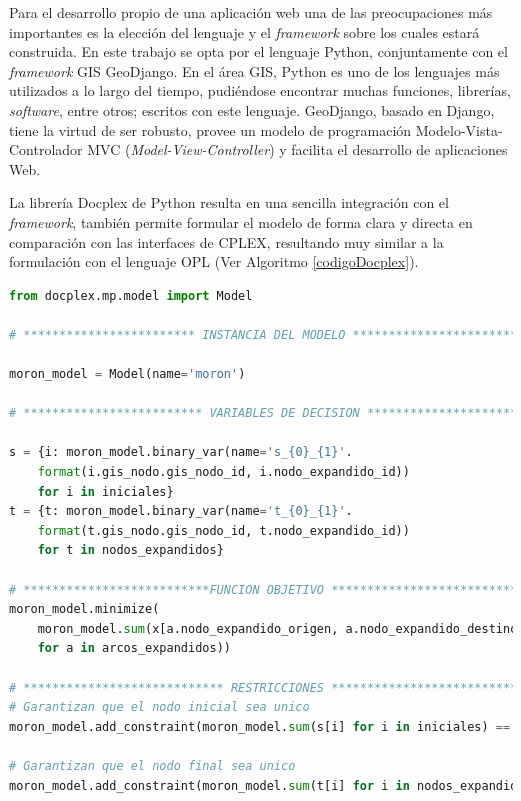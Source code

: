 Para el desarrollo propio de una aplicación web una de las preocupaciones más importantes es la elección del lenguaje y el \textit{framework} sobre los cuales estará construida. En este trabajo se opta por el lenguaje Python, conjuntamente con el \textit{framework} GIS GeoDjango. En el área GIS, Python es uno de los lenguajes más utilizados a lo largo del tiempo, pudiéndose encontrar muchas funciones, librerías, \textit{software}, entre otros; escritos con este lenguaje. GeoDjango, basado en Django, tiene la virtud de ser robusto, provee un modelo de programación Modelo-Vista-Controlador MVC (\textit{Model-View-Controller}) y facilita el desarrollo de aplicaciones Web.

La librería Docplex de Python resulta en una sencilla integración con el \textit{framework}, también permite formular el modelo de forma clara y directa en comparación con las interfaces de CPLEX, resultando muy similar a la formulación con el lenguaje OPL (Ver Algoritmo \ref{codigoDocplex}).

\hfill
\begin{lstlisting}[language=Python,caption={Fragmento de código en Docplex},label={codigoDocplex}]
from docplex.mp.model import Model

# ************************ INSTANCIA DEL MODELO ******************************

moron_model = Model(name='moron')
    
# ************************* VARIABLES DE DECISION ****************************

s = {i: moron_model.binary_var(name='s_{0}_{1}'.
    format(i.gis_nodo.gis_nodo_id, i.nodo_expandido_id)) 
    for i in iniciales}
t = {t: moron_model.binary_var(name='t_{0}_{1}'.
    format(t.gis_nodo.gis_nodo_id, t.nodo_expandido_id)) 
    for t in nodos_expandidos}

# **************************FUNCION OBJETIVO *********************************
moron_model.minimize(
    moron_model.sum(x[a.nodo_expandido_origen, a.nodo_expandido_destino] * a.peso 
    for a in arcos_expandidos))
    
# **************************** RESTRICCIONES *********************************
# Garantizan que el nodo inicial sea unico
moron_model.add_constraint(moron_model.sum(s[i] for i in iniciales) == 1)

# Garantizan que el nodo final sea unico
moron_model.add_constraint(moron_model.sum(t[i] for i in nodos_expandidos) == 1))
\end{lstlisting}

